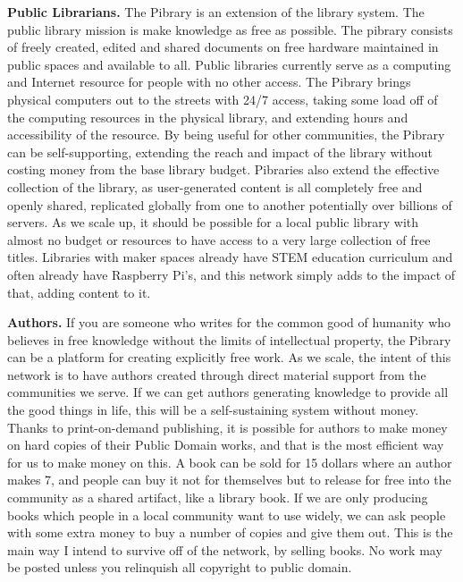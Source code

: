 \textbf{Public Librarians.} The Pibrary is an extension of the library
system. The public library mission is make knowledge as free as
possible. The pibrary consists of freely created, edited and shared
documents on free hardware maintained in public spaces and available to
all. Public libraries currently serve as a computing and Internet
resource for people with no other access. The Pibrary brings physical
computers out to the streets with 24/7 access, taking some load off of
the computing resources in the physical library, and extending hours and
accessibility of the resource. By being useful for other communities,
the Pibrary can be self-supporting, extending the reach and impact of
the library without costing money from the base library budget.
Pibraries also extend the effective collection of the library, as
user-generated content is all completely free and openly shared,
replicated globally from one to another potentially over billions of
servers. As we scale up, it should be possible for a local public
library with almost no budget or resources to have access to a very
large collection of free titles. Libraries with maker spaces already
have STEM education curriculum and often already have Raspberry Pi's,
and this network simply adds to the impact of that, adding content to
it.

\textbf{Authors.} If you are someone who writes for the common good of
humanity who believes in free knowledge without the limits of
intellectual property, the Pibrary can be a platform for creating
explicitly free work. As we scale, the intent of this network is to have
authors created through direct material support from the communities we
serve. If we can get authors generating knowledge to provide all the
good things in life, this will be a self-sustaining system without
money. Thanks to print-on-demand publishing, it is possible for authors
to make money on hard copies of their Public Domain works, and that is
the most efficient way for us to make money on this. A book can be sold
for 15 dollars where an author makes 7, and people can buy it not for
themselves but to release for free into the community as a shared
artifact, like a library book. If we are only producing books which
people in a local community want to use widely, we can ask people with
some extra money to buy a number of copies and give them out. This is
the main way I intend to survive off of the network, by selling books.
No work may be posted unless you relinquish all copyright to public
domain.

